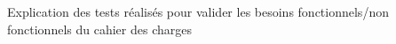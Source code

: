 Explication des tests réalisés pour valider les besoins fonctionnels/non fonctionnels du cahier des charges
